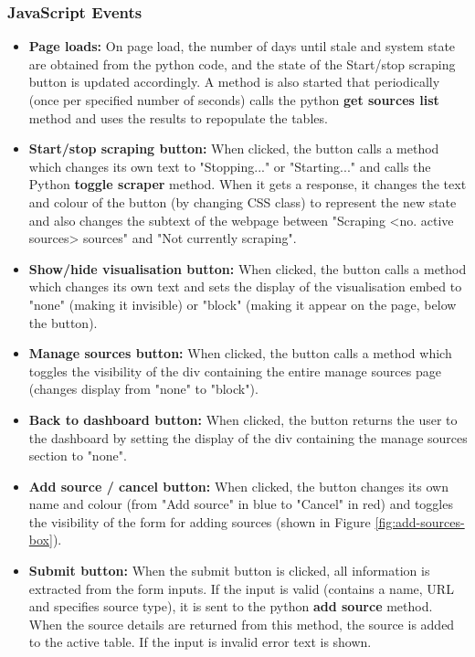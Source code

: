 \documentclass{l4proj}
\begin{document}
\subsubsection{JavaScript Events}
\begin{itemize}
    \item \textbf{Page loads: } On page load, the number of days until stale and system state are obtained from the python code, and the state of the Start/stop scraping button is updated accordingly. A method is also started that periodically (once per specified number of seconds) calls the python \textbf{get sources list} method and uses the results to repopulate the tables.
    \item \textbf{Start/stop scraping button:} When clicked, the button calls a method which changes its own text to "Stopping..." or "Starting..." and calls the Python \textbf{toggle scraper} method. When it gets a response, it changes the text and colour of the button (by changing CSS class) to represent the new state and also changes the subtext of the webpage between "Scraping <no. active sources> sources" and "Not currently scraping".
    \item \textbf{Show/hide visualisation button: } When clicked, the button calls a method which changes its own text and sets the display of the visualisation embed to "none" (making it invisible) or "block" (making it appear on the page, below the button).
    \item \textbf{Manage sources button: } When clicked, the button calls a method which toggles the visibility of the div containing the entire manage sources page (changes display from "none" to "block").
    \item \textbf{Back to dashboard button: } When clicked, the button returns the user to the dashboard by setting the display of the div containing the manage sources section to "none".
    \item \textbf{Add source / cancel button: } When clicked, the button changes its own name and colour (from "Add source" in blue to "Cancel" in red) and toggles the visibility of the form for adding sources (shown in Figure \ref{fig:add-sources-box}).
    \item \textbf{Submit button: } When the submit button is clicked, all information is extracted from the form inputs. If the input is valid (contains a name, URL and specifies source type), it is sent to the python \textbf{add source} method. When the source details are returned from this method, the source is added to the active table. If the input is invalid error text is shown.

\end{itemize}
\end{document}
